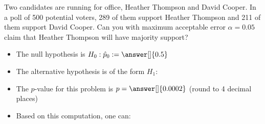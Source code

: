 \documentclass{ximera}
\begin{document}
\begin{question}
Two candidates are running for office, Heather Thompson and David Cooper.  In a poll of 500 potential voters, 289 of them support Heather Thompson and 211 of them support David Cooper.  Can you with maximum acceptable error $\alpha=0.05$ claim that Heather Thompson will have majority support?

\begin{itemize}
\item The null hypothesis is $H_0:\hat{p}_0:=  \answer[]{0.5}$
\item  The alternative hypothesis is of the form $H_1:$
\begin{multipleChoice}
\end{multipleChoice}
\item The $p$-value for this problem is $p=\answer[]{0.0002}$ (round to 4 decimal places)
\item Based on this computation, one can:
\begin{multipleChoice}
\end{multipleChoice}

\end{itemize}

\end{question}
\end{document}
